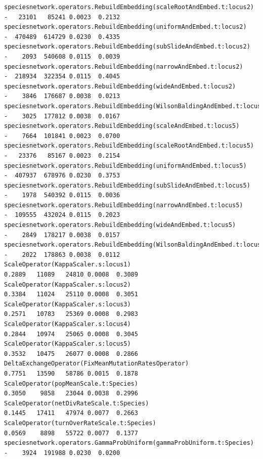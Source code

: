 \documentclass[11pt]{article}
\begin{document}
{\begin{verbatim}
speciesnetwork.operators.RebuildEmbedding(scaleRootAndEmbed.t:locus2)           -   23101   85241 0.0023  0.2132 
speciesnetwork.operators.RebuildEmbedding(uniformAndEmbed.t:locus2)             -  470489  614729 0.0230  0.4335 
speciesnetwork.operators.RebuildEmbedding(subSlideAndEmbed.t:locus2)            -    2093  540608 0.0115  0.0039 
speciesnetwork.operators.RebuildEmbedding(narrowAndEmbed.t:locus2)              -  218934  322354 0.0115  0.4045 
speciesnetwork.operators.RebuildEmbedding(wideAndEmbed.t:locus2)                -    3846  176687 0.0038  0.0213 
speciesnetwork.operators.RebuildEmbedding(WilsonBaldingAndEmbed.t:locus2)       -    3025  177812 0.0038  0.0167 
speciesnetwork.operators.RebuildEmbedding(scaleAndEmbed.t:locus5)               -    7664  101841 0.0023  0.0700 
speciesnetwork.operators.RebuildEmbedding(scaleRootAndEmbed.t:locus5)           -   23376   85167 0.0023  0.2154 
speciesnetwork.operators.RebuildEmbedding(uniformAndEmbed.t:locus5)             -  407937  678976 0.0230  0.3753 
speciesnetwork.operators.RebuildEmbedding(subSlideAndEmbed.t:locus5)            -    1978  540392 0.0115  0.0036 
speciesnetwork.operators.RebuildEmbedding(narrowAndEmbed.t:locus5)              -  109555  432024 0.0115  0.2023 
speciesnetwork.operators.RebuildEmbedding(wideAndEmbed.t:locus5)                -    2849  178217 0.0038  0.0157 
speciesnetwork.operators.RebuildEmbedding(WilsonBaldingAndEmbed.t:locus5)       -    2022  178863 0.0038  0.0112 
ScaleOperator(KappaScaler.s:locus1)                                        0.2889   11089   24810 0.0008  0.3089 
ScaleOperator(KappaScaler.s:locus2)                                        0.3384   11024   25110 0.0008  0.3051 
ScaleOperator(KappaScaler.s:locus3)                                        0.2571   10783   25369 0.0008  0.2983 
ScaleOperator(KappaScaler.s:locus4)                                        0.2844   10974   25065 0.0008  0.3045 
ScaleOperator(KappaScaler.s:locus5)                                        0.3532   10475   26077 0.0008  0.2866 
DeltaExchangeOperator(FixMeanMutationRatesOperator)                        0.7751   13590   58786 0.0015  0.1878 
ScaleOperator(popMeanScale.t:Species)                                      0.3050    9858   23044 0.0038  0.2996 
ScaleOperator(netDivRateScale.t:Species)                                   0.1445   17411   47974 0.0077  0.2663 
ScaleOperator(turnOverRateScale.t:Species)                                 0.0569    8898   55722 0.0077  0.1377 
speciesnetwork.operators.GammaProbUniform(gammaProbUniform.t:Species)           -    3924  191988 0.0230  0.0200 

\end{verbatim}}
\end{document}
